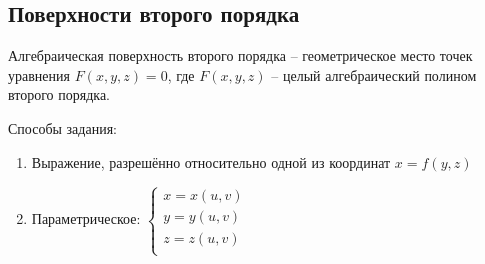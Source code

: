 \documentclass{book}
\theoremstyle{definition}
\begin{document}
\subsection{Поверхности второго порядка}

\begin{definition}
    Алгебраическая поверхность второго порядка -- геометрическое место точек уравнения $F(x,y,z) = 0$, где  $F(x,y,z)$ -- целый алгебраический полином второго порядка. 
\end{definition}

Способы задания:
\begin{enumerate}
    \item Выражение, разрешённо относительно одной из координат $x = f(y,z)$
    \item Параметрическое: $\begin{cases}
            x = x(u,v)\\
            y = y(u,v)\\
            z = z(u,v)\\
    \end{cases}$
\end{enumerate}
\end{document}
